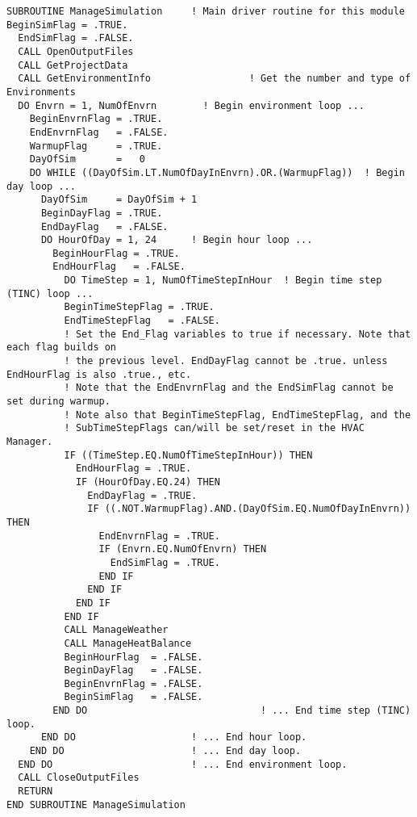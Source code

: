 \begin{lstlisting}
SUBROUTINE ManageSimulation     ! Main driver routine for this module
BeginSimFlag = .TRUE.
  EndSimFlag = .FALSE.
  CALL OpenOutputFiles
  CALL GetProjectData
  CALL GetEnvironmentInfo                 ! Get the number and type of Environments
  DO Envrn = 1, NumOfEnvrn        ! Begin environment loop ...
    BeginEnvrnFlag = .TRUE.
    EndEnvrnFlag   = .FALSE.
    WarmupFlag     = .TRUE.
    DayOfSim       =   0
    DO WHILE ((DayOfSim.LT.NumOfDayInEnvrn).OR.(WarmupFlag))  ! Begin day loop ...
      DayOfSim     = DayOfSim + 1
      BeginDayFlag = .TRUE.
      EndDayFlag   = .FALSE.
      DO HourOfDay = 1, 24      ! Begin hour loop ...
        BeginHourFlag = .TRUE.
        EndHourFlag   = .FALSE.
          DO TimeStep = 1, NumOfTimeStepInHour  ! Begin time step (TINC) loop ...
          BeginTimeStepFlag = .TRUE.
          EndTimeStepFlag   = .FALSE.
          ! Set the End_Flag variables to true if necessary. Note that each flag builds on
          ! the previous level. EndDayFlag cannot be .true. unless EndHourFlag is also .true., etc.
          ! Note that the EndEnvrnFlag and the EndSimFlag cannot be set during warmup.
          ! Note also that BeginTimeStepFlag, EndTimeStepFlag, and the
          ! SubTimeStepFlags can/will be set/reset in the HVAC Manager.
          IF ((TimeStep.EQ.NumOfTimeStepInHour)) THEN
            EndHourFlag = .TRUE.
            IF (HourOfDay.EQ.24) THEN
              EndDayFlag = .TRUE.
              IF ((.NOT.WarmupFlag).AND.(DayOfSim.EQ.NumOfDayInEnvrn)) THEN
                EndEnvrnFlag = .TRUE.
                IF (Envrn.EQ.NumOfEnvrn) THEN
                  EndSimFlag = .TRUE.
                END IF
              END IF
            END IF
          END IF
          CALL ManageWeather
          CALL ManageHeatBalance
          BeginHourFlag  = .FALSE.
          BeginDayFlag   = .FALSE.
          BeginEnvrnFlag = .FALSE.
          BeginSimFlag   = .FALSE.
        END DO                              ! ... End time step (TINC) loop.
      END DO                    ! ... End hour loop.
    END DO                      ! ... End day loop.
  END DO                        ! ... End environment loop.
  CALL CloseOutputFiles
  RETURN
END SUBROUTINE ManageSimulation
\end{lstlisting}

